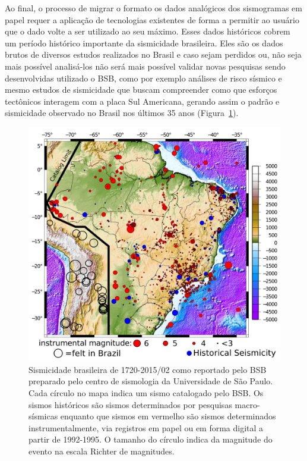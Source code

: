 \documentclass{article}
\begin{document}
Ao final, o processo de migrar o formato os dados analógicos dos
sismogramas em papel requer a aplicação de tecnologias existentes de
forma a permitir ao usuário que o dado volte a ser utilizado ao seu
máximo. Esses dados históricos cobrem um período histórico importante
da sismicidade brasileira. Eles são os dados brutos de diversos
estudos realizados no Brasil e caso sejam perdidos ou, não seja mais
possível analisá-los não será mais possível validar novas pesquisas
sendo desenvolvidas utilizado o BSB, como por exemplo análises de
risco sísmico e mesmo estudos de sismicidade que buscam compreender
como que esforços tectônicos interagem com a placa Sul Americana,
gerando assim o padrão e sismicidade observado no Brasil nos últimos
35 anos (Figura~\ref{sismicidade}).


\begin{figure}[htb]
  \begin{center}
    \includegraphics[scale=0.4]{mapa.png}
    \caption{Sismicidade brasileira de 1720-2015/02 como reportado
      pelo BSB preparado pelo centro de sismologia da Universidade de
      São Paulo. Cada círculo no mapa indica um sismo catalogado pelo
      BSB. Os sismos históricos são sismos determinados por pesquisas
      macro-sísmicas enquanto que sismos em vermelho são sismos
      determinados instrumentalmente, via registros em papel ou em
      forma digital a partir de 1992-1995. O tamanho do círculo indica
      da magnitude do evento na escala Richter de magnitudes.}
    \label{sismicidade}
  \end{center}
\end{figure}
\end{document}
